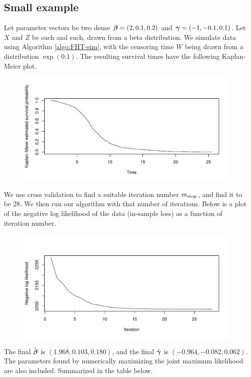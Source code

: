 \subsection{Small example}
Let parameter vectors be two dense $\boldsymbol{\beta}=(2,0.1,0.2)$ and $\boldsymbol{\gamma}=(-1, -0.1, 0.1)$. Let $X$ and $Z$ be such and such, drawn from a beta distribution.
We simulate data using Algorithm \ref{algo:FHT-sim}, with the censoring time $W$ being drawn from a distribution $\exp(0.1)$. The resulting survival times have the following Kaplan-Meier plot.
\begin{figure}[H]\centering\includegraphics[scale=0.4]{figures/case1.pdf}\end{figure}
We use cross validation to find a suitable iteration number $m_{\text{stop}}$, and find it to be 28. We then run our algorithm with that number of iterations. Below is a plot of the negative log likelihood of the data (in-sample loss) as a function of iteration number.
\begin{figure}[H]\centering\includegraphics[scale=0.4]{figures/case1_loglik.pdf}\end{figure}
The final $\hat{\boldsymbol{\beta}}$ is $(1.968, 0.103, 0.180)$, and the final $\hat{\boldsymbol{\gamma}}$ is $(-0.964, -0.082, 0.062)$. The parameters found by numerically maximizing the joint maximum likelihood are also included. Summarized in the table below.

